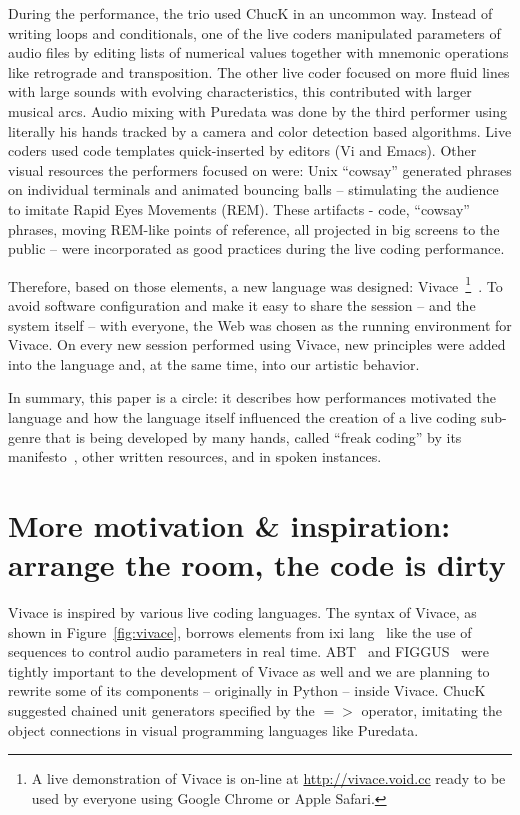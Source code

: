 \documentclass[letterpaper, 12pt]{article}
\begin{document}
During the performance, the trio used ChucK in an uncommon
way. Instead of writing loops and conditionals, one of the live coders
manipulated parameters of audio files by editing lists of numerical
values together with mnemonic operations like retrograde and
transposition.  The other live coder focused on more fluid lines with
large sounds with evolving characteristics, this contributed with
larger musical arcs.  Audio mixing with Puredata was done by the
third performer using literally his hands tracked by a camera and
color detection based algorithms. Live coders used code templates
quick-inserted by editors (Vi and Emacs). Other visual resources the
performers focused on were: Unix ``cowsay'' generated phrases on
individual terminals and animated bouncing balls -- stimulating the
audience to imitate Rapid Eyes Movements (REM). These artifacts -
code, ``cowsay'' phrases, moving REM-like points of reference, all
projected in big screens to the public -- were incorporated as good
practices during the live coding performance.

Therefore, based on those elements, a new language was designed:
Vivace~\footnote{A live demonstration of Vivace is on-line at
  \url{http://vivace.void.cc} ready to be used by everyone using
  Google Chrome or Apple Safari.}~\citep*{Vivace}.  To avoid software
configuration and make it easy to share the session -- and the system
itself -- with everyone, the Web was chosen as the running
environment for Vivace. On every new session performed using Vivace,
new principles were added into the language and, at the same time,
into our artistic behavior.

In summary, this paper is a circle: it describes how performances
motivated the language and how the language itself influenced the
creation of a live coding sub-genre that is being developed by many
hands, called ``freak coding'' by its manifesto~\citep*{freak}, other
written resources, and in spoken instances.

\parskip 18pt

\section{More motivation \& inspiration: arrange the room, the code is dirty}

Vivace is inspired by various live coding languages. The syntax of
Vivace, as shown in Figure~\ref{fig:vivace}, borrows elements from ixi
lang~\citep{magnusson2011ixi} like the use of sequences to control
audio parameters in real time. ABT~\citep{fabbri} and
FIGGUS~\citep{fabbri2} were tightly important to the development of
Vivace as well and we are planning to rewrite some of its components
-- originally in Python -- inside Vivace. ChucK suggested chained unit
generators specified by the $=>$ operator, imitating the object
connections in visual programming languages like Puredata.
\end{document}
